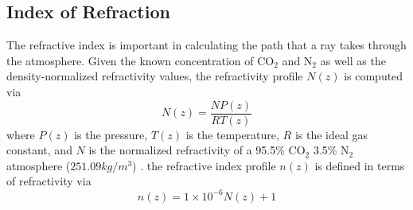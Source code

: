 \subsection{Index of Refraction}
The refractive index is important in calculating the path that a ray takes through the atmosphere. Given the known concentration of CO$_2$ and N$_2$ as well as the density-normalized refractivity values, the refractivity profile $N(z)$ is computed via
\begin{equation}
N(z) = \frac{NP(z)}{RT(z)}
\end{equation}
where $P(z)$ is the pressure, $T(z)$ is the temperature, $R$ is the ideal gas constant, and $N$ is the normalized refractivity of a 95.5\% CO$_2$ 3.5\% N$_2$ atmosphere ($251.09 kg/m^3$) \cite{Essen-1951}. the refractive index profile $n(z)$ is defined in terms of refractivity via
\begin{equation}
n(z) = 1 \times 10^{-6} N(z) +1
\end{equation}